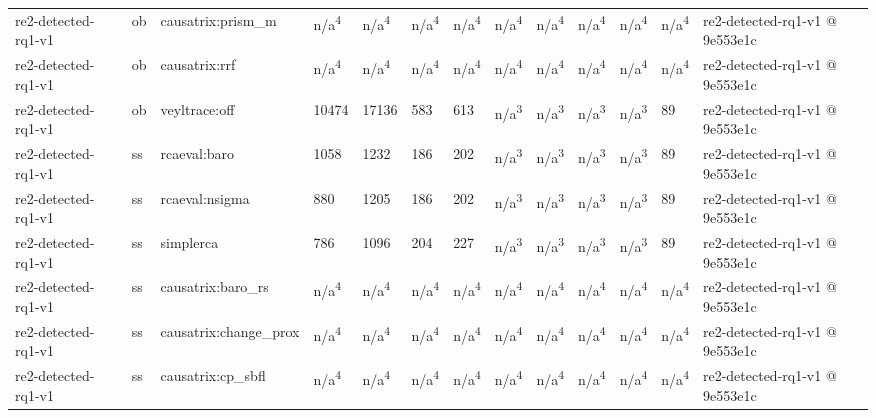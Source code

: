 \begin{table}[t]
\begin{tabular}{lllllllllllll}
re2-detected-rq1-v1 & ob & causatrix:prism\_m & n/a\textsuperscript{4} & n/a\textsuperscript{4} & n/a\textsuperscript{4} & n/a\textsuperscript{4} & n/a\textsuperscript{4} & n/a\textsuperscript{4} & n/a\textsuperscript{4} & n/a\textsuperscript{4} & n/a\textsuperscript{4} & re2-detected-rq1-v1 @ 9e553e1c \\
re2-detected-rq1-v1 & ob & causatrix:rrf & n/a\textsuperscript{4} & n/a\textsuperscript{4} & n/a\textsuperscript{4} & n/a\textsuperscript{4} & n/a\textsuperscript{4} & n/a\textsuperscript{4} & n/a\textsuperscript{4} & n/a\textsuperscript{4} & n/a\textsuperscript{4} & re2-detected-rq1-v1 @ 9e553e1c \\
re2-detected-rq1-v1 & ob & veyltrace:off & 10474 & 17136 & 583 & 613 & n/a\textsuperscript{3} & n/a\textsuperscript{3} & n/a\textsuperscript{3} & n/a\textsuperscript{3} & 89 & re2-detected-rq1-v1 @ 9e553e1c \\
re2-detected-rq1-v1 & ss & rcaeval:baro & 1058 & 1232 & 186 & 202 & n/a\textsuperscript{3} & n/a\textsuperscript{3} & n/a\textsuperscript{3} & n/a\textsuperscript{3} & 89 & re2-detected-rq1-v1 @ 9e553e1c \\
re2-detected-rq1-v1 & ss & rcaeval:nsigma & 880 & 1205 & 186 & 202 & n/a\textsuperscript{3} & n/a\textsuperscript{3} & n/a\textsuperscript{3} & n/a\textsuperscript{3} & 89 & re2-detected-rq1-v1 @ 9e553e1c \\
re2-detected-rq1-v1 & ss & simplerca & 786 & 1096 & 204 & 227 & n/a\textsuperscript{3} & n/a\textsuperscript{3} & n/a\textsuperscript{3} & n/a\textsuperscript{3} & 89 & re2-detected-rq1-v1 @ 9e553e1c \\
re2-detected-rq1-v1 & ss & causatrix:baro\_rs & n/a\textsuperscript{4} & n/a\textsuperscript{4} & n/a\textsuperscript{4} & n/a\textsuperscript{4} & n/a\textsuperscript{4} & n/a\textsuperscript{4} & n/a\textsuperscript{4} & n/a\textsuperscript{4} & n/a\textsuperscript{4} & re2-detected-rq1-v1 @ 9e553e1c \\
re2-detected-rq1-v1 & ss & causatrix:change\_prox & n/a\textsuperscript{4} & n/a\textsuperscript{4} & n/a\textsuperscript{4} & n/a\textsuperscript{4} & n/a\textsuperscript{4} & n/a\textsuperscript{4} & n/a\textsuperscript{4} & n/a\textsuperscript{4} & n/a\textsuperscript{4} & re2-detected-rq1-v1 @ 9e553e1c \\
re2-detected-rq1-v1 & ss & causatrix:cp\_sbfl & n/a\textsuperscript{4} & n/a\textsuperscript{4} & n/a\textsuperscript{4} & n/a\textsuperscript{4} & n/a\textsuperscript{4} & n/a\textsuperscript{4} & n/a\textsuperscript{4} & n/a\textsuperscript{4} & n/a\textsuperscript{4} & re2-detected-rq1-v1 @ 9e553e1c \\

\end{tabular}
\end{table}
